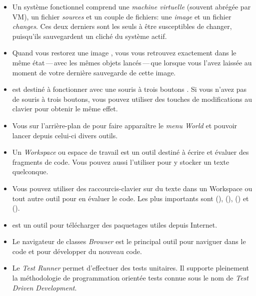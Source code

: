 \documentclass[a4paper,10pt,twoside]{book}
\begin{document}
\begin{itemize}
  \item Un système \pharo fonctionnel comprend une \emph{machine
      virtuelle} (souvent abrégée par VM), un fichier
    \emph{sources} et un couple de fichiers: une \emph{image} et un
    fichier \emph{changes}. Ces deux derniers sont les seuls à
    être susceptibles de changer, puisqu'ils sauvegardent un cliché
    du système actif.
  \item Quand vous restorez une image \pharo, vous vous retrouvez
    exactement dans le même état\,---\,avec les mêmes objets
    lancés\,---\,que lorsque vous l'avez laissée au moment de votre dernière
    sauvegarde de cette image.
  \item \pharo est destiné à fonctionner avec une souris à trois
    boutons .
 Si vous n'avez pas de souris à trois boutons, vous pouvez utiliser
 des touches de modifications au clavier pour obtenir le même effet.
  \item Vous \clickz sur l'arrière-plan de
    \pharo pour faire apparaître le \emph{menu World} et pouvoir
    lancer depuis celui-ci divers outils.
  \item Un \emph{Workspace} ou espace de travail est un outil
    destiné à écrire et évaluer des fragments de code. Vous
    pouvez aussi l'utiliser pour y stocker un texte quelconque.
  \item Vous pouvez utiliser des raccourcis-clavier sur du texte
    dans un Workspace ou tout autre outil pour en
    évaluer le code. Les plus importants sont 
    (),  (), 
    () et  ().
  \item \sqmap est un outil pour télécharger des paquetages utiles
    depuis Internet.
  \item Le navigateur de classes \emph{Browser} est le
    principal outil pour naviguer dans le code \pharo et pour
    développer du nouveau code.
  \item Le \emph{Test Runner} permet d'effectuer des tests
    unitaires. Il supporte pleinement la méthodologie de
    programmation orientée tests connue sous le nom de \emph{Test
      Driven Development}.
\end{itemize}

\ifx\wholebook\relax\else 
   
   
\end{document}
